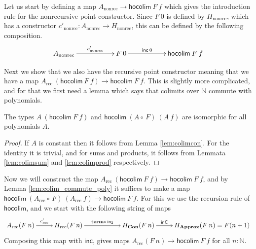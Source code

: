 \documentclass[a4paper,UKenglish]{lipics-v2016}
\newcommand{\Boperator}[1]{\mathsf{#1}}
\newcommand{\inn}{\Boperator{in}}
\newcommand{\comp}[0]{\circ \,}
\newcommand{\rec}[0]{\operatorname{rec}}
\newcommand{\nonrec}[0]{\operatorname{nonrec}}
\newcommand{\term}[0]{\textbf{term}}
\newcommand{\Con}[0]{\textbf{Con}}
\newcommand{\Approx}[0]{\textbf{Approx}}
\newcommand{\inC}[0]{\Boperator{inC}}
\newcommand{\hocolim}[0]{\Boperator{hocolim}}
\newcommand{\inc}[0]{\Boperator{inc}}
\begin{document}
Let us start by defining a map $A_{\nonrec} \rightarrow \hocolim \> F \> f$ which gives the introduction rule for the nonrecursive point constructor.
Since $F \> 0$ is defined by $H_{\nonrec}$, which has a constructor $c'_{\nonrec} : A_{\nonrec} \rightarrow H_{\nonrec}$, this can be defined by the following composition.
\[
\xymatrix
{
        A_{\nonrec} \ar[rr]^-{c'_{\nonrec}}
                & & F \> 0 \ar[rr]^-{\inc \> 0}
                & & \hocolim \> F \> f
}
\]

Next we show that we also have the recursive point constructor meaning that we have a map $A_{\rec} \> (\hocolim \> F \> f) \rightarrow \hocolim \> F \> f$.
This is slightly more complicated, and for that we first need a lemma which says that colimits over $\mathbb{N}$ commute with polynomials.

\begin{lemma}
\label{lem:colim_commute_poly}
The types $A \> (\hocolim \> F \> f)$ and $\hocolim \> (A \comp F) \> (A \> f)$ are isomorphic for all polynomials $A$.
\end{lemma}

\begin{proof}
If $A$ is constant then it follows from Lemma \ref{lem:colimcon}.
For the identity it is trivial, and for sums and products, it follows from Lemmata \ref{lem:colimsum} and \ref{lem:colimprod} respectively. 
\end{proof}

Now we will construct the map $A_{\rec} \> (\hocolim \> F \> f) \rightarrow \hocolim \> F \> f$, and by Lemma \ref{lem:colim_commute_poly} it suffices to make a map $\hocolim \> (A_{\rec} \comp F) \> (A_{\rec} \> f) \rightarrow \hocolim \> F \> f$.
For this we use the recursion rule of $\hocolim$, and we start with the following string of maps
\[
\xymatrix
{
                A_{\rec}(F \> n) \ar[r]^-{c_{\rec}'} 
                & H_{\rec}(F \> n) \ar[rr]^-{\term \comp \inn_2} &
                & H_{\Con}(F \> n) \ar[r]^-{\inC}
                & H_{\Approx}(F \> n) = F(n + 1)
}
\]
Composing this map with $\inc$, gives maps $A_{\rec}(F \> n) \rightarrow \hocolim \> F \> f$ for all $n : \mathbb{N}$.
\end{document}
